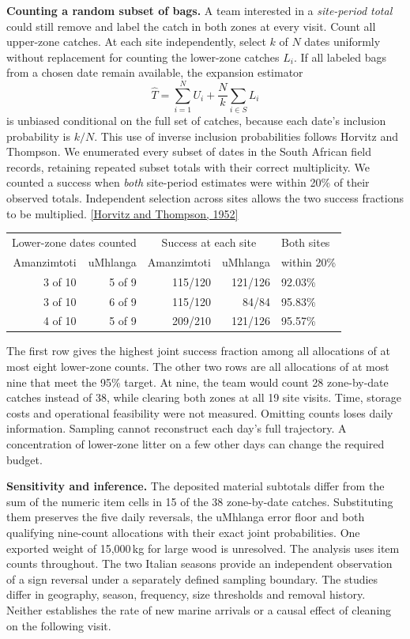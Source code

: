\documentclass[10pt]{article}
\newcommand{\para}[1]{\medskip\textbf{#1}\enspace}
\newcommand{\src}[2]{\href{#1}{[#2]}}
\begin{document}
\newpage
\para{Counting a random subset of bags.}
A team interested in a \emph{site-period total} could still remove and label the catch in both zones at every visit. Count all upper-zone catches. At each site independently, select $k$ of $N$ dates uniformly without replacement for counting the lower-zone catches $L_i$. If all labeled bags from a chosen date remain available, the expansion estimator
\[
\widehat T=\sum_{i=1}^{N}U_i+\frac{N}{k}\sum_{i\in S}L_i
\]
is unbiased conditional on the full set of catches, because each date's inclusion probability is $k/N$. This use of inverse inclusion probabilities follows Horvitz and Thompson. We enumerated every subset of dates in the South African field records, retaining repeated subset totals with their correct multiplicity. We counted a success when \emph{both} site-period estimates were within 20\% of their observed totals. Independent selection across sites allows the two success fractions to be multiplied.
\src{https://doi.org/10.1080/01621459.1952.10483446}{Horvitz and Thompson, 1952}

\begin{center}
\begin{tabular}{rrrrl}\toprule
\multicolumn{2}{c}{Lower-zone dates counted} & \multicolumn{2}{c}{Success at each site} & Both sites\\
Amanzimtoti & uMhlanga & Amanzimtoti & uMhlanga & within 20\%\\\midrule
3 of 10 & 5 of 9 & 115/120 & 121/126 & 92.03\%\\
3 of 10 & 6 of 9 & 115/120 & 84/84 & 95.83\%\\
4 of 10 & 5 of 9 & 209/210 & 121/126 & 95.57\%\\\bottomrule
\end{tabular}
\end{center}

The first row gives the highest joint success fraction among all allocations of at most eight lower-zone counts. The other two rows are all allocations of at most nine that meet the 95\% target. At nine, the team would count 28 zone-by-date catches instead of 38, while clearing both zones at all 19 site visits. Time, storage costs and operational feasibility were not measured. Omitting counts loses daily information. Sampling cannot reconstruct each day's full trajectory. A concentration of lower-zone litter on a few other days can change the required budget.

\para{Sensitivity and inference.}
The deposited material subtotals differ from the sum of the numeric item cells in 15 of the 38 zone-by-date catches. Substituting them preserves the five daily reversals, the uMhlanga error floor and both qualifying nine-count allocations with their exact joint probabilities. One exported weight of 15,000\,kg for large wood is unresolved. The analysis uses item counts throughout. The two Italian seasons provide an independent observation of a sign reversal under a separately defined sampling boundary. The studies differ in geography, season, frequency, size thresholds and removal history. Neither establishes the rate of new marine arrivals or a causal effect of cleaning on the following visit.
\end{document}
